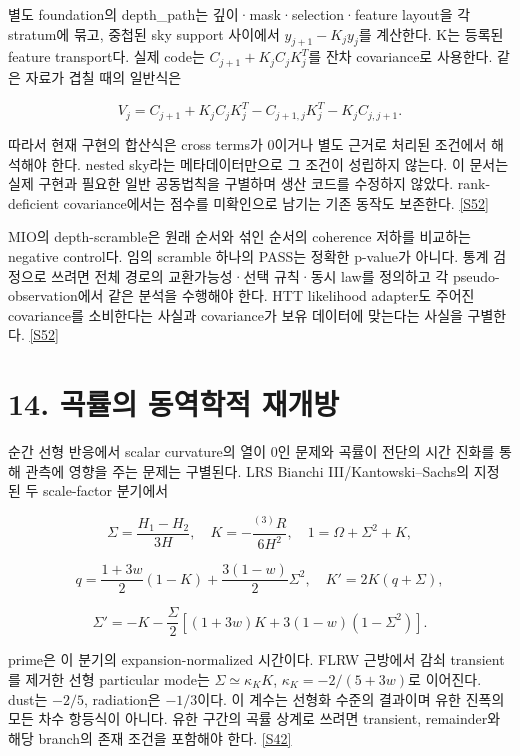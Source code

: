 \documentclass[11pt,a4paper]{article}
\begin{document}
별도 foundation의 depth\_path는 깊이·mask·selection·feature layout을 각 stratum에 묶고, 중첩된 sky support 사이에서 \(y_{j+1}-K_jy_j\)를 계산한다. K는 등록된 feature transport다. 실제 code는 \(C_{j+1}+K_jC_jK_j^T\)를 잔차 covariance로 사용한다. 같은 자료가 겹칠 때의 일반식은


\[
V_j=C_{j+1}+K_jC_jK_j^T
-C_{j+1,j}K_j^T-K_jC_{j,j+1}.
\]

따라서 현재 구현의 합산식은 cross terms가 0이거나 별도 근거로 처리된 조건에서 해석해야 한다. nested sky라는 메타데이터만으로 그 조건이 성립하지 않는다. 이 문서는 실제 구현과 필요한 일반 공동법칙을 구별하며 생산 코드를 수정하지 않았다. rank-deficient covariance에서는 점수를 미확인으로 남기는 기존 동작도 보존한다. \hyperlink{src:S52}{[S52]}


MIO의 depth-scramble은 원래 순서와 섞인 순서의 coherence 저하를 비교하는 negative control다. 임의 scramble 하나의 PASS는 정확한 p-value가 아니다. 통계 검정으로 쓰려면 전체 경로의 교환가능성·선택 규칙·동시 law를 정의하고 각 pseudo-observation에서 같은 분석을 수행해야 한다. HTT likelihood adapter도 주어진 covariance를 소비한다는 사실과 covariance가 보유 데이터에 맞는다는 사실을 구별한다. \hyperlink{src:S52}{[S52]}


\hypertarget{s14}{}

\section*{14. 곡률의 동역학적 재개방}


순간 선형 반응에서 scalar curvature의 열이 0인 문제와 곡률이 전단의 시간 진화를 통해 관측에 영향을 주는 문제는 구별된다. LRS Bianchi III/Kantowski–Sachs의 지정된 두 scale-factor 분기에서


\[
\Sigma=\frac{H_1-H_2}{3H},\quad K=-\frac{{}^{(3)}R}{6H^2},\quad
1=\Omega+\Sigma^2+K,
\]

\[
q=\frac{1+3w}{2}(1-K)+\frac{3(1-w)}{2}\Sigma^2,
\quad K'=2K(q+\Sigma),
\]

\[
\Sigma'=-K-\frac{\Sigma}{2}
\left[(1+3w)K+3(1-w)(1-\Sigma^2)\right].
\]

prime은 이 분기의 expansion-normalized 시간이다. FLRW 근방에서 감쇠 transient를 제거한 선형 particular mode는 \(\Sigma\simeq\kappa_K K\), \(\kappa_K=-2/(5+3w)\)로 이어진다. dust는 \(-2/5\), radiation은 \(-1/3\)이다. 이 계수는 선형화 수준의 결과이며 유한 진폭의 모든 차수 항등식이 아니다. 유한 구간의 곡률 상계로 쓰려면 transient, remainder와 해당 branch의 존재 조건을 포함해야 한다. \hyperlink{src:S42}{[S42]}
\end{document}
